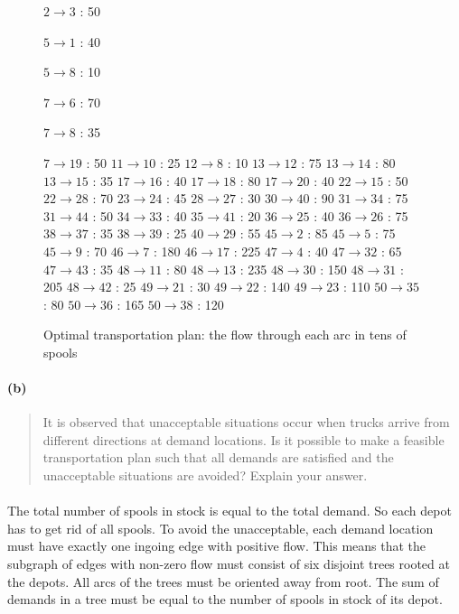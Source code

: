 \begin{figure}[H]
\centering
\begin{multicols}{5}
$ 2 \rightarrow 3 $ : 50

$ 5 \rightarrow 1 $ : 40

$ 5 \rightarrow 8 $ : 10

$ 7 \rightarrow 6 $ : 70

$ 7 \rightarrow 8 $ : 35

$ 7 \rightarrow 19 $ : 50
$ 11 \rightarrow 10 $ : 25
$ 12 \rightarrow 8 $ : 10
$ 13 \rightarrow 12 $ : 75
$ 13 \rightarrow 14 $ : 80
$ 13 \rightarrow 15 $ : 35
$ 17 \rightarrow 16 $ : 40
$ 17 \rightarrow 18 $ : 80
$ 17 \rightarrow 20 $ : 40
$ 22 \rightarrow 15 $ : 50
$ 22 \rightarrow 28 $ : 70
$ 23 \rightarrow 24 $ : 45
$ 28 \rightarrow 27 $ : 30
$ 30 \rightarrow 40 $ : 90
$ 31 \rightarrow 34 $ : 75
$ 31 \rightarrow 44 $ : 50
$ 34 \rightarrow 33 $ : 40
$ 35 \rightarrow 41 $ : 20
$ 36 \rightarrow 25 $ : 40
$ 36 \rightarrow 26 $ : 75
$ 38 \rightarrow 37 $ : 35
$ 38 \rightarrow 39 $ : 25
$ 40 \rightarrow 29 $ : 55
$ 45 \rightarrow 2 $ : 85
$ 45 \rightarrow 5 $ : 75
$ 45 \rightarrow 9 $ : 70
$ 46 \rightarrow 7 $ : 180
$ 46 \rightarrow 17 $ : 225
$ 47 \rightarrow 4 $ : 40
$ 47 \rightarrow 32 $ : 65
$ 47 \rightarrow 43 $ : 35
$ 48 \rightarrow 11 $ : 80
$ 48 \rightarrow 13 $ : 235
$ 48 \rightarrow 30 $ : 150
$ 48 \rightarrow 31 $ : 205
$ 48 \rightarrow 42 $ : 25
$ 49 \rightarrow 21 $ : 30
$ 49 \rightarrow 22 $ : 140
$ 49 \rightarrow 23 $ : 110
$ 50 \rightarrow 35 $ : 80
$ 50 \rightarrow 36 $ : 165
$ 50 \rightarrow 38 $ : 120
\end{multicols}
\caption{Optimal transportation plan: the flow through each arc in tens of spools}
\label{flow3-2a}
\end{figure}

\paragraph{(b)}
\begin{quote}
It is observed that unacceptable situations occur when trucks arrive from different directions at demand locations. Is it possible to make a feasible transportation plan such that all demands are satisfied and the unacceptable situations are avoided? Explain your answer.
\end{quote}

\paragraph{}
The total number of spools in stock is equal to the total demand. So each depot has to get rid of all spools. To avoid the unacceptable, each demand location must have exactly one ingoing edge with positive flow. This means that the subgraph of edges with non-zero flow must consist of six disjoint trees rooted at the depots. All arcs of the trees must be oriented away from root. The sum of demands in a tree must be equal to the number of spools in stock of its depot.

